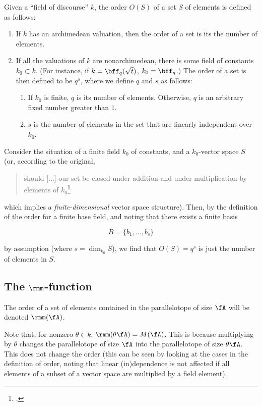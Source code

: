 \begin{defn}
  Given a ``field of discourse'' $k$, the order $O(S)$ of a set $S$ of elements
  is defined as follows:
  \begin{enumerate}
  \item If $k$ has an archimedean valuation, then the order of a set is its the
    number of elements.
  \item If all the valuations of $k$ are nonarchimedean, there is some field of
    constants $k_0 \subset k$. (For instance, if $k = \bff_q(\sqrt t)$, $k_0 =
    \bff_q$.) The order of a set is then defined to be $q^s$, where we define
    $q$ and $s$ as follows:
    \begin{enumerate}
    \item If $k_0$ is finite, $q$ is its number of elements. Otherwise, $q$ is
      an arbitrary fixed number greater than $1$.
    \item $s$ is the number of elements in the set that are linearly independent
      over $k_0$.
    \end{enumerate}
  \end{enumerate}
\end{defn}

\begin{example}
  Consider the situation of a finite field $k_0$ of constants, and a
  $k_0$-vector space $S$ (or, according to the original,
  \begin{quotation}
    should [...] our set be closed under addition and under multiplication by
    elements of $k_0$\footcite[p. 474]{artinwhaples}
  \end{quotation}
  which implies a \textit{finite-dimensional} vector space structure). Then, by
  the definition of the order for a finite base field, and noting that there
  exists a finite basis

  \[ B = \{b_1, \ldots, b_s \}\]

  by assumption (where $s = \dim_{k_0}S$), we find that $O(S) = q^s$ is just
  the number of elements in $S$.

\end{example}
\subsection{The $\rmm$-function}
\label{subsec:mfunction}
The order of a set of elements contained in the parallelotope of size $\fA$ will
be denoted $\rmm(\fA)$.

Note that, for nonzero $\theta\in k$, $\rmm(\theta\fA)=M(\fA)$. This is because
multiplying by $\theta$ changes the parallelotope of size $\fA$ into the
parallelotope of size $\theta\fA$. This does not change the order (this can be
seen by looking at the cases in the definition of order, noting that linear
(in)dependence is not affected if all elements of a subset of a vector space are
multiplied by a field element).


